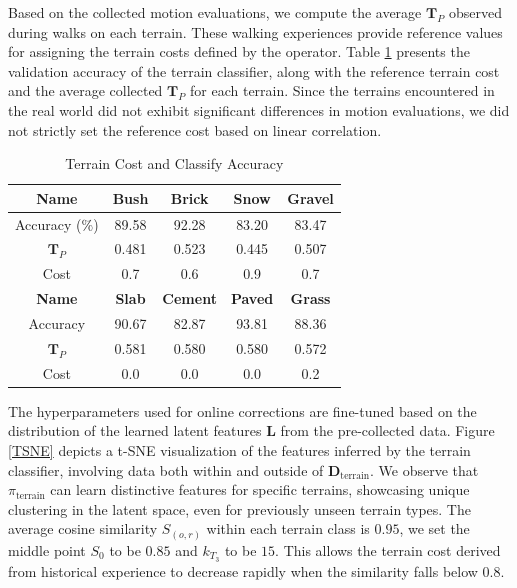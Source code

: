 \documentclass[conference]{IEEEtran}
\begin{document}
Based on the collected motion evaluations, we compute the average $\bm{T}_P$ observed during walks on each terrain. These walking experiences provide reference values for assigning the terrain costs defined by the operator. Table \ref{accuracy} presents the validation accuracy of the terrain classifier, along with the reference terrain cost and the average collected $\bm{T}_P$ for each terrain. Since the terrains encountered in the real world did not exhibit significant differences in motion evaluations, we did not strictly set the reference cost based on linear correlation.
\begin{table}[h]
\small
\renewcommand{\arraystretch}{1.3}
\caption{Terrain Cost and Classify Accuracy}
\begin{center}
\begin{tabular}{|c|c|c|c|c|}
\hline
 \textbf{Name}&\textbf{Bush}&\textbf{Brick}&\textbf{Snow}&\textbf{Gravel}\\
 \hline
 Accuracy ($\%$)&89.58&92.28&83.20&83.47\\
 \hline
 $\bm{T}_P$&0.481&0.523&0.445&0.507\\
 \hline
 Cost&0.7&0.6&0.9&0.7\\
 \hline
 \textbf{Name}&\textbf{Slab}&\textbf{Cement}&\textbf{Paved}&\textbf{Grass}\\
 \hline
 Accuracy&90.67&82.87&93.81&88.36\\
 \hline
 $\bm{T}_P$&0.581&0.580&0.580&0.572\\
 \hline
 Cost&0.0&0.0&0.0&0.2\\
 \hline
\end{tabular}
\label{accuracy}
\end{center}
\end{table}

The hyperparameters used for online corrections are fine-tuned based on the distribution of the learned latent features $\bm{L}$ from the pre-collected data. Figure \ref{TSNE} depicts a t-SNE visualization of the features inferred by the terrain classifier, involving data both within and outside of $\bm{D}_\textrm{terrain}$. We observe that $\pi_{\textrm{terrain}}$ can learn distinctive features for specific terrains, showcasing unique clustering in the latent space, even for previously unseen terrain types. The average cosine similarity $S_{(o,r)}$ within each terrain class is $0.95$, we set the middle point $S_0$ to be $0.85$ and $k_{T_3}$ to be $15$. This allows the terrain cost derived from historical experience to decrease rapidly when the similarity falls below $0.8$.
\end{document}

